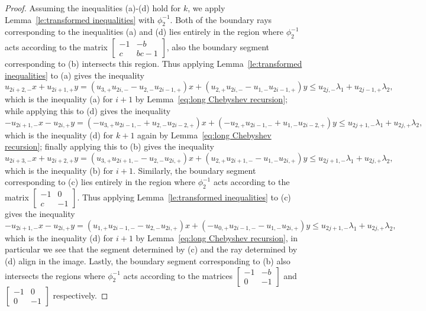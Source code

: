 \documentclass{amsart}
\numberwithin{theorem}{section}
\begin{document}
\begin{proof}
    Assuming the inequalities (a)-(d) hold for $k$, we apply Lemma~\ref{le:transformed inequalities} with $\phi_2^{-1}$.
    Both of the boundary rays corresponding to the inequalities (a) and (d) lies entirely in the region where $\phi_2^{-1}$ acts according to the matrix $\left[ \begin{array}{cc} -1 & -b\\ c & bc-1 \end{array}\right]$, also the boundary segment corresponding to (b) intersects this region.
    Thus applying Lemma~\ref{le:transformed inequalities} to (a) gives the inequality 
    \[u_{2i+2,-}x+u_{2i+1,+}y=(u_{3,+}u_{2i,-}-u_{2,-}u_{2i-1,+})x+(u_{2,+}u_{2i,-}-u_{1,-}u_{2i-1,+})y\le u_{2j,-}\lambda_1+u_{2j-1,+}\lambda_2,\]
    which is the inequality (a) for $i+1$ by Lemma~\ref{eq:long Chebyshev recursion}; while applying this to (d) gives the inequality 
    \[-u_{2i+1,-}x-u_{2i,+}y=(-u_{3,+}u_{2i-1,-}+u_{2,-}u_{2i-2,+})x+(-u_{2,+}u_{2i-1,-}+u_{1,-}u_{2i-2,+})y\le u_{2j+1,-}\lambda_1+u_{2j,+}\lambda_2,\]
    which is the inequality (d) for $k+1$ again by Lemma~\ref{eq:long Chebyshev recursion}; finally applying this to (b) gives the inequality 
    \[u_{2i+3,-}x+u_{2i+2,+}y=(u_{3,+}u_{2i+1,-}-u_{2,-}u_{2i,+})x+(u_{2,+}u_{2i+1,-}-u_{1,-}u_{2i,+})y\le u_{2j+1,-}\lambda_1+u_{2j,+}\lambda_2,\]
    which is the inequality (b) for $i+1$.
    Similarly, the boundary segment corresponding to (c) lies entirely in the region where $\phi_2^{-1}$ acts according to the matrix $\left[ \begin{array}{cc} -1 & 0\\ c & -1 \end{array}\right]$.
    Thus applying Lemma~\ref{le:transformed inequalities} to (c) gives the inequality 
    \[-u_{2i+1,-}x-u_{2i,+}y=(u_{1,+}u_{2i-1,-}-u_{2,-}u_{2i,+})x+(-u_{0,+}u_{2i-1,-}-u_{1,-}u_{2i,+})y\le u_{2j+1,-}\lambda_1+u_{2j,+}\lambda_2,\]
    which is the inequality (d) for $i+1$ by Lemma~\ref{eq:long Chebyshev recursion}, in particular we see that the segment determined by (c) and the ray determined by (d) align in the image.
    Lastly, the boundary segment corresponding to (b) also intersects the regions where $\phi_2^{-1}$ acts according to the matrices $\left[ \begin{array}{cc} -1 & -b\\ 0 & -1 \end{array}\right]$ and $\left[ \begin{array}{cc} -1 & 0\\ 0 & -1 \end{array}\right]$ respectively.

\end{proof}
\end{document}

